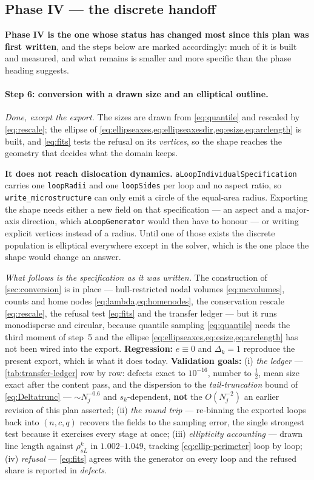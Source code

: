 \documentclass{article}
\newcommand{\code}[1]{\texttt{#1}}
\begin{document}
\subsection{Phase IV --- the discrete handoff}

\textbf{Phase IV is the one whose status has changed most since this plan was
first written}, and the steps below are marked accordingly: much of it is built
and measured, and what remains is smaller and more specific than the phase
heading suggests.

\paragraph{Step 6: conversion with a drawn size and an elliptical outline.}
\emph{Done, except the export.} The sizes are drawn from \cref{eq:quantile} and
rescaled by \cref{eq:rescale}; the ellipse of
\cref{eq:ellipseaxes,eq:ellipseaxesdir,eq:esize,eq:arclength} is built, and
\cref{eq:fits} tests the refusal on its \emph{vertices}, so the shape reaches
the geometry that decides what the domain keeps.

\textbf{It does not reach dislocation dynamics.}
\code{aLoopIndividualSpecification} carries one \code{loopRadii} and one
\code{loopSides} per loop and no aspect ratio, so \code{write\_microstructure}
can only emit a circle of the equal-area radius. Exporting the shape needs
either a new field on that specification --- an aspect and a major-axis
direction, which \code{aLoopGenerator} would then have to honour --- or writing
explicit vertices instead of a radius. Until one of those exists the discrete
population is elliptical everywhere except in the solver, which is the one place
the shape would change an answer.

\emph{What follows is the specification as it was written.} The construction of \cref{sec:conversion} is in place
--- hull-restricted nodal volumes \cref{eq:mcvolumes}, counts and home nodes
\cref{eq:lambda,eq:homenodes}, the conservation rescale \cref{eq:rescale}, the
refusal test \cref{eq:fits} and the transfer ledger --- but it runs monodisperse
and circular, because quantile sampling \cref{eq:quantile} needs the third moment
of step~5 and the ellipse \cref{eq:ellipseaxes,eq:esize,eq:arclength} has not been
wired into the export. \textbf{Regression:} $e\equiv0$ and $\Delta_k=1$ reproduce
the present export, which is what it does today.
\textbf{Validation goals:} (i) \emph{the ledger} --- \cref{tab:transfer-ledger}
row by row: defects exact to $10^{-16}$, number to $\tfrac12$, mean size exact
after the content pass, and the dispersion to the \emph{tail-truncation} bound of
\cref{eq:Deltatrunc} --- $\sim N_j^{-0.6}$ and $s_k$-dependent, \textbf{not} the
$O(N_j^{-2})$ an earlier revision of this plan asserted; (ii) \emph{the round
trip} --- re-binning the exported loops back into $(n,c,q)$ recovers the fields to
the sampling error, the single strongest test because it exercises every stage at
once; (iii) \emph{ellipticity accounting} --- drawn line length against
$\rho^k_{sL}$ in $1.002$--$1.049$, tracking \cref{eq:ellip-perimeter} loop by
loop; (iv) \emph{refusal} --- \cref{eq:fits} agrees with the generator on every
loop and the refused share is reported in \emph{defects}.
\end{document}
